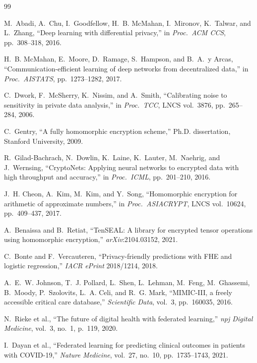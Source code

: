 \documentclass[10pt,journal,compsoc]{IEEEtran}
\begin{document}

\begin{thebibliography}{99}

M.~Abadi, A.~Chu, I.~Goodfellow, H.~B. McMahan, I.~Mironov,
K.~Talwar, and L.~Zhang,
``Deep learning with differential privacy,''
in \emph{Proc.\ ACM CCS}, pp.~308--318, 2016.

H.~B. McMahan, E.~Moore, D.~Ramage, S.~Hampson, and
B.~A.~y Arcas,
``Communication-efficient learning of deep networks from
decentralized data,''
in \emph{Proc.\ AISTATS}, pp.~1273--1282, 2017.

C.~Dwork, F.~McSherry, K.~Nissim, and A.~Smith,
``Calibrating noise to sensitivity in private data analysis,''
in \emph{Proc.\ TCC}, LNCS vol.~3876, pp.~265--284, 2006.

C.~Gentry, ``A fully homomorphic encryption scheme,''
Ph.D. dissertation, Stanford University, 2009.

R.~Gilad-Bachrach, N.~Dowlin, K.~Laine, K.~Lauter,
M.~Naehrig, and J.~Wernsing,
``CryptoNets: Applying neural networks to encrypted data
with high throughput and accuracy,''
in \emph{Proc.\ ICML}, pp.~201--210, 2016.

J.~H. Cheon, A.~Kim, M.~Kim, and Y.~Song,
``Homomorphic encryption for arithmetic of approximate numbers,''
in \emph{Proc.\ ASIACRYPT}, LNCS vol.~10624, pp.~409--437, 2017.

A.~Benaissa and B.~Retiat,
``TenSEAL: A library for encrypted tensor operations using
homomorphic encryption,''
\emph{arXiv}:2104.03152, 2021.

C.~Bonte and F.~Vercauteren,
``Privacy-friendly predictions with FHE and logistic regression,''
\emph{IACR ePrint} 2018/1214, 2018.

A.~E.~W. Johnson, T.~J. Pollard, L.~Shen,
L.~Lehman, M.~Feng, M.~Ghassemi, B.~Moody,
P.~Szolovits, L.~A. Celi, and R.~G. Mark,
``MIMIC-III, a freely accessible critical care database,''
\emph{Scientific Data}, vol.~3, pp.~160035, 2016.

N.~Rieke et al.,
``The future of digital health with federated learning,''
\emph{npj Digital Medicine}, vol.~3, no.~1, p.~119, 2020.

I.~Dayan et al.,
``Federated learning for predicting clinical outcomes in
patients with COVID-19,''
\emph{Nature Medicine}, vol.~27, no.~10, pp.~1735--1743, 2021.


\end{thebibliography}
\end{document}
